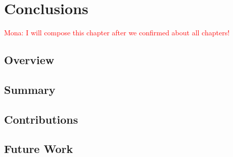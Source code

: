 \chapter{Conclusions}
\label{cha:conc}
\textcolor{red}{Mona: I will compose this chapter after we confirmed about all chapters!}\\

\section{Overview}
\label{sec:overview}

\section{Summary}
\label{sec:summary}

\section{Contributions}
\label{sec:contributions}

\section{Future Work}
\label{sec:future}




